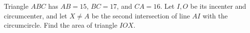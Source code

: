 Triangle $ABC$ has $AB=15$, $BC=17$, and $CA=16$. Let $I,O$ be its incenter and circumcenter, and let $X\ne A$ be the second intersection of line $AI$ with the circumcircle. Find the area of triangle $IOX$.
